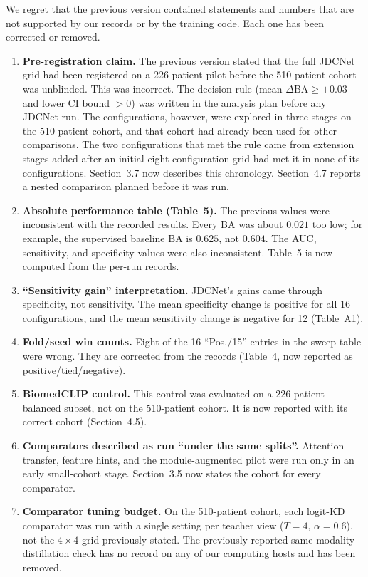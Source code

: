 \documentclass[11pt]{article}
\begin{document}
We regret that the previous version contained statements and numbers that are
not supported by our records or by the training code. Each one has been
corrected or removed.

\begin{enumerate}[leftmargin=1.6em]
  \item \textbf{Pre-registration claim.} The previous version stated that the full JDCNet grid had been registered on a 226-patient pilot before the 510-patient cohort was unblinded. This was incorrect. The decision rule (mean $\Delta\mathrm{BA}\geq+0.03$ and lower CI bound $>0$) was written in the analysis plan before any JDCNet run. The configurations, however, were explored in three stages on the 510-patient cohort, and that cohort had already been used for other comparisons. The two configurations that met the rule came from extension stages added after an initial eight-configuration grid had met it in none of its configurations. Section~3.7 now describes this chronology. Section~4.7 reports a nested comparison planned before it was run.
  \item \textbf{Absolute performance table (Table~5).} The previous values were inconsistent with the recorded results. Every BA was about $0.021$ too low; for example, the supervised baseline BA is $0.625$, not $0.604$. The AUC, sensitivity, and specificity values were also inconsistent. Table~5 is now computed from the per-run records.
  \item \textbf{``Sensitivity gain'' interpretation.} JDCNet's gains came through specificity, not sensitivity. The mean specificity change is positive for all 16 configurations, and the mean sensitivity change is negative for 12 (Table~A1).
  \item \textbf{Fold/seed win counts.} Eight of the 16 ``Pos./15'' entries in the sweep table were wrong. They are corrected from the records (Table~4, now reported as positive/tied/negative).
  \item \textbf{BiomedCLIP control.} This control was evaluated on a 226-patient balanced subset, not on the 510-patient cohort. It is now reported with its correct cohort (Section~4.5).
  \item \textbf{Comparators described as run ``under the same splits''.} Attention transfer, feature hints, and the module-augmented pilot were run only in an early small-cohort stage. Section~3.5 now states the cohort for every comparator.
  \item \textbf{Comparator tuning budget.} On the 510-patient cohort, each logit-KD comparator was run with a single setting per teacher view ($T{=}4$, $\alpha{=}0.6$), not the $4\times4$ grid previously stated. The previously reported same-modality distillation check has no record on any of our computing hosts and has been removed.

\end{enumerate}
\end{document}
